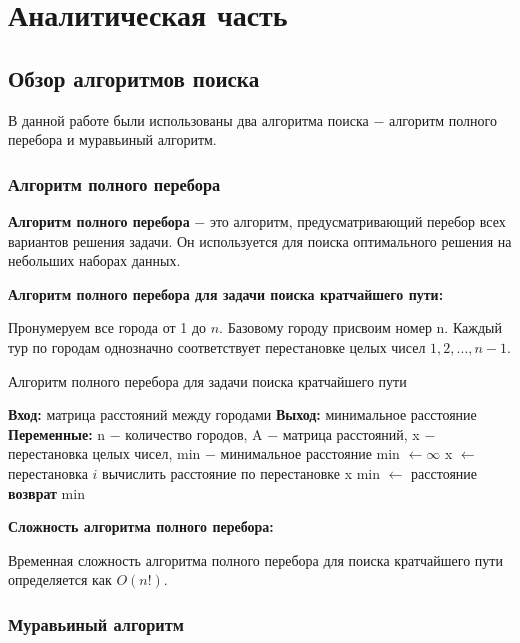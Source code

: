 \chapter{Аналитическая часть}

\section{Обзор алгоритмов поиска}

В данной работе были использованы два алгоритма поиска $-$ алгоритм полного перебора и муравьиный алгоритм.
\subsection{Алгоритм полного перебора}

\textbf{Алгоритм полного перебора} $-$ это алгоритм, предусматривающий перебор всех вариантов решения задачи. Он используется для поиска оптимального решения на небольших наборах данных.

\textbf{Алгоритм полного перебора для задачи поиска кратчайшего пути:}

Пронумеруем все города от 1 до $n$. Базовому городу присвоим номер n. Каждый тур по городам однозначно соответствует перестановке целых чисел $1, 2, ..., n-1$.


\begin{algorithm}
\caption{Алгоритм полного перебора для задачи поиска кратчайшего пути}
\label{alg:full_search}
\begin{algorithmic}[1]
\State \textbf{Вход:} матрица расстояний между городами
\State \textbf{Выход:} минимальное расстояние
\State \textbf{Переменные:} n $-$ количество городов, A $-$ матрица расстояний, x $-$ перестановка целых чисел, min $-$ минимальное расстояние
\State min $\leftarrow \infty$
	\State x $\leftarrow$ перестановка $i$
	\State вычислить расстояние по перестановке x
		\State min $\leftarrow$ расстояние
	\EndIf
\EndFor
\State \textbf{возврат} min
\end{algorithmic}
\end{algorithm}

\textbf{Сложность алгоритма полного перебора:}

Временная сложность алгоритма полного перебора для поиска кратчайшего пути определяется как $O(n!)$.

\subsection{Муравьиный алгоритм}

